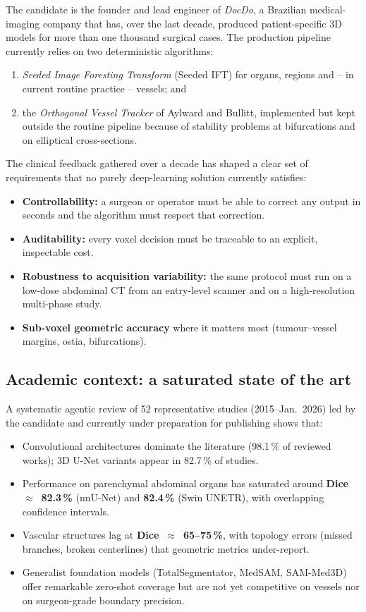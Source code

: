 \documentclass[a4paper,11pt,twoside]{article}
\begin{document}
The candidate is the founder and lead engineer of \textit{DocDo}, a
Brazilian medical-imaging company that has, over the last decade, produced
patient-specific 3D models for more than one thousand surgical cases. The
production pipeline currently relies on two deterministic algorithms:
\begin{enumerate}[label=(\roman*), noitemsep, topsep=3pt]
  \item \emph{Seeded Image Foresting Transform} (Seeded IFT) for organs,
        regions and -- in current routine practice -- vessels; and
  \item the \emph{Orthogonal Vessel Tracker} of Aylward and Bullitt,
        implemented but kept outside the routine pipeline because of
        stability problems at bifurcations and on elliptical cross-sections.
\end{enumerate}
The clinical feedback gathered
over a decade has shaped a clear set of requirements that no purely
deep-learning solution currently satisfies:
\begin{itemize}
  \item \textbf{Controllability:} a surgeon or operator must be able to correct any
        output in seconds and the algorithm must respect that correction.
  \item \textbf{Auditability:} every voxel decision must be traceable to an
        explicit, inspectable cost.
  \item \textbf{Robustness to acquisition variability:} the same protocol must
        run on a low-dose abdominal CT from an entry-level scanner and on a
        high-resolution multi-phase study.
  \item \textbf{Sub-voxel geometric accuracy} where it matters most
        (tumour--vessel margins, ostia, bifurcations).
\end{itemize}

\subsection{Academic context: a saturated state of the art}

A systematic agentic review of 52 representative studies (2015--Jan.~2026) led by the
candidate and currently under preparation for publishing shows that:
\begin{itemize}
  \item Convolutional architectures dominate the literature (98.1\,\% of
        reviewed works); 3D U-Net variants appear in 82.7\,\% of studies.
  \item Performance on parenchymal abdominal organs has saturated around
        \textbf{Dice~$\approx$~82.3\,\%} (nnU-Net) and
        \textbf{82.4\,\%} (Swin UNETR), with overlapping confidence intervals.
  \item Vascular structures lag at \textbf{Dice~$\approx$~65--75\,\%}, with
        topology errors (missed branches, broken centerlines) that geometric
        metrics under-report.
  \item Generalist foundation models (TotalSegmentator, MedSAM, SAM-Med3D)
        offer remarkable zero-shot coverage but are not yet competitive on
        vessels nor on surgeon-grade boundary precision.
\end{itemize}
\end{document}
